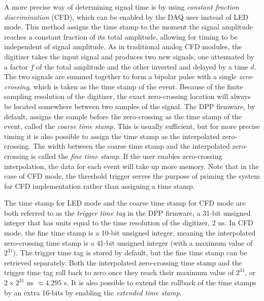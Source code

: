 A more precise way of determining signal time is by using \emph{constant fraction discrimination} (CFD), which can be enabled by the DAQ user instead of LED mode. This method assigns the time stamp to the moment the signal amplitude reaches a constant fraction of its total amplitude, allowing for timing to be independent of signal amplitude. As in traditional analog CFD modules, the digitizer takes the input signal and produces two new signals, one attenuated by a factor $f$ of the total amplitude and the other inverted and delayed by a time $d$. The two signals are summed together to form a bipolar pulse with a single \emph{zero-crossing}, which is taken as the time stamp of the event. Because of the finite sampling resolution of the digitizer, the exact zero-crossing location will always be located somewhere between two samples of the signal. The DPP firmware, by default, assigns the sample before the zero-crossing as the time stamp of the event, called the \emph{coarse time stamp}. This is usually sufficient, but for more precise timing it is also possible to assign the time stamp as the interpolated zero-crossing. The width between the coarse time stamp and the interpolated zero-crossing is called the \emph{fine time stamp}. If the user enables zero-crossing interpolation, the data for each event will take up more memory. Note that in the case of CFD mode, the threshold trigger serves the purpose of priming the system for CFD implementation rather than assigning a time stamp.

The time stamp for LED mode and the coarse time stamp for CFD mode are both referred to as the \emph{trigger time tag} in the DPP firmware, a 31-bit unsigned integer that has units equal to the time resolution of the digitizer, 2 ns. In CFD mode, the fine time stamp is a 10-bit unsigned integer, meaning the interpolated zero-crossing time stamp is a 41-bit unsigned integer (with a maximum value of $2^{31}$). The trigger time tag is stored by default, but the fine time stamp can be retrieved separately. Both the interpolated zero-crossing time stamp and the trigger time tag roll back to zero once they reach their maximum value of $2^{31}$, or $2 \times 2^{31}$ ns $\approx 4.295$ s. It is also possible to extend the rollback of the time stamps by an extra 16-bits by enabling the \emph{extended time stamp}. %

